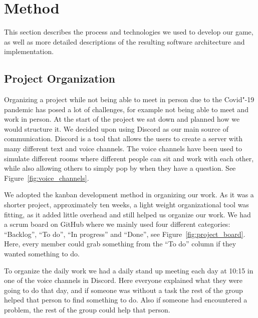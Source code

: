 \documentclass[a4paper]{article}
\begin{document}

\section{Method}
This section describes the process and technologies we used to develop our game, as well as more detailed descriptions of the resulting software architecture and implementation.

\subsection{Project Organization}
Organizing a project while not being able to meet in person due to the Covid"-19 pandemic has posed a lot of challenges, for example not being able to meet and work in person. At the start of the project we sat down and planned how we would structure it. We decided upon using Discord as our main source of communication. Discord is a tool that allows the users to create a server with many different text and voice channels. The voice channels have been used to simulate different rooms where different people can sit and work with each other, while also allowing others to simply pop by when they have a question. See Figure~\ref{fig:voice_channels}.

We adopted the kanban development method in organizing our work. As it was a shorter project, approximately ten weeks, a light weight organizational tool was fitting, as it added little overhead and still helped us organize our work. We had a scrum board on GitHub where we mainly used four different categories: ``Backlog'', ``To do'', ``In progress'' and ``Done'', see Figure~\ref{fig:project_board}. Here, every member could grab something from the ``To do'' column if they wanted something to do.

To organize the daily work we had a daily stand up meeting each day at 10:15 in one of the voice channels in Discord. Here everyone explained what they were going to do that day, and if someone was without a task the rest of the group helped that person to find something to do. Also if someone had encountered a problem, the rest of the group could help that person.
\end{document}
